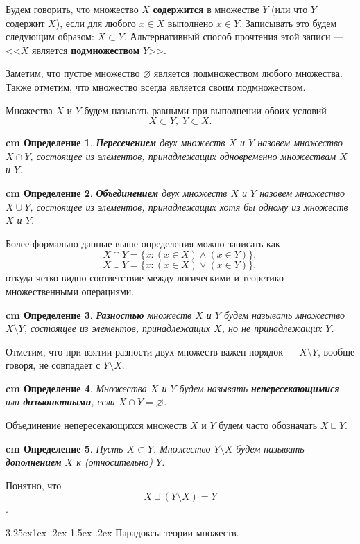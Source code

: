 \documentclass[12pt, russian]{article}
\makeatletter
\renewcommand\subsubsection{\@startsection{subsubsection}{3}{\parindent}%
	{3.25ex\@plus 1ex \@minus .2ex}%
	{1.5ex \@plus .2ex}%
	{\normalfont\large\bfseries}}
\newtheorem{definition}{\hskip 0.5 cm Определение}%
\makeatother
\begin{document}
Будем говорить, что множество $X$ \textbf{содержится} в множестве $Y$ (или что $Y$ содержит $X$), если для любого $x \in X$ выполнено $x \in Y$. Записывать это будем следующим образом: $X \subset Y$. Альтернативный способ прочтения этой записи --- <<$X$ является \textbf{подмножеством} $Y$>>.

Заметим, что пустое множество $\varnothing$ является подмножеством любого множества. Также отметим, что множество всегда является своим подмножеством.

Множества $X$ и $Y$ будем называть равными при выполнении обоих условий
$$
X \subset Y, \; Y \subset X.
$$

\begin{definition}
	\textbf{Пересечением} двух множеств $X$ и $Y$ назовем множество $X \cap Y$, состоящее из элементов, принадлежащих одновременно множествам $X$ и $Y$.
\end{definition}
\begin{definition}
	\textbf{Объединением} двух множеств $X$ и $Y$ назовем множество $X \cup Y$, состоящее из элементов, принадлежащих хотя бы одному из множеств $X$ и $Y$.
\end{definition}
Более формально данные выше определения можно записать как
$$
X \cap Y = \{ x:  (x \in X) \wedge (x \in Y) \},
$$
$$
X \cup Y = \{ x:  (x \in X) \vee (x \in Y) \},
$$
откуда четко видно соответствие между логическими и теоретико-множественными операциями.
\begin{definition}
	\textbf{Разностью} множеств $X$ и $Y$ будем называть множество $X \setminus Y$, состоящее из элементов, принадлежащих $X$, но не принадлежащих $Y$.
\end{definition}
Отметим, что при взятии разности двух множеств важен порядок --- $X\setminus Y$, вообще говоря, не совпадает с $Y \setminus X$.
\begin{definition}
	Множества $X$ и $Y$ будем называть \textbf{непересекающимися} или \textbf{дизъюнктными}, если $X \cap Y = \varnothing$.
\end{definition}
Объединение непересекающихся множеств $X$ и $Y$ будем часто обозначать $X \sqcup Y$.
\begin{definition}
	Пусть $X \subset Y$. Множество $Y \setminus X$ будем называть \textbf{дополнением } $X$ к (относительно) $Y$.
\end{definition}
Понятно, что $$X \sqcup (Y \setminus X) = Y$$.


\subsubsection{Парадоксы теории множеств.}
\end{document}
